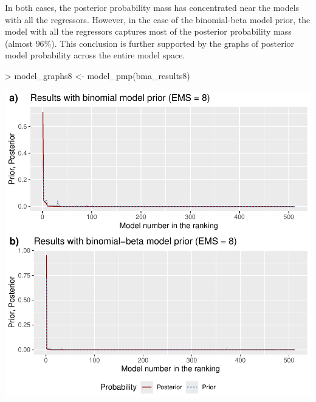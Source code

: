 \documentclass[a4paper]{article}
\begin{document}
In both cases, the posterior probability mass has concentrated near the models with all the regressors.
However, in the case of the binomial-beta model prior, the model with all the regressors captures most of the posterior probability mass (almost $96\%$).
This conclusion is further supported by the graphs of posterior model probability across the entire model space.
\begin{Schunk}
\begin{Sinput}
> model_graphs8 <- model_pmp(bma_results8)
\end{Sinput}
\end{Schunk}
\includegraphics{bdsm_vignette-035}
\end{document}
